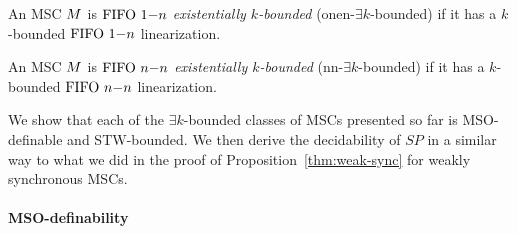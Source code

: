 \begin{definition}
	An MSC $M$ is \emph{$\text{FIFO } 1\mathsf{-}n$ existentially $k$-bounded} (onen-$\exists k$-bounded) if it has a $k$-bounded $\text{FIFO } 1\mathsf{-}n$ linearization.
\end{definition}

\begin{definition}
	An MSC $M$ is \emph{$\text{FIFO } n\mathsf{-}n$ existentially $k$-bounded} (nn-$\exists k$-bounded) if it has a $k$-bounded $\text{FIFO } n\mathsf{-}n$ linearization.
\end{definition}

We show that each of the $\exists k$-bounded classes of MSCs presented so far is MSO-definable and STW-bounded. We then derive the decidability of $SP$ in a similar way to what we did in the proof of Proposition~\ref{thm:weak-sync} for weakly synchronous MSCs.

\paragraph*{MSO-definability}

